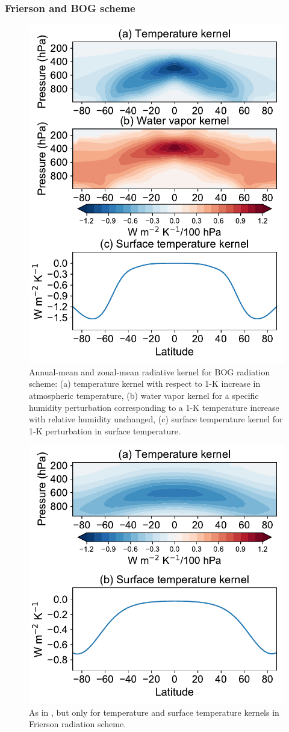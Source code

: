 \subsubsection{Frierson and BOG scheme}
\begin{figure}[tbhp] %
	\centering
	\includegraphics[width=.6\linewidth]{figs/polar_amp/kernels_byrne}
	\caption{Annual-mean and zonal-mean radiative kernel for BOG radiation scheme: (a) temperature kernel with respect to 1-K increase in atmospheric temperature, (b) water vapor kernel for a specific humidity perturbation corresponding to a 1-K temperature increase with relative humidity unchanged, (c) surface temperature kernel for 1-K perturbation in surface temperature.}
	\label{fig:bog_kernels}
\end{figure}

\begin{figure}[tbhp] %
	\centering
	\includegraphics[width=.6\linewidth]{figs/polar_amp/kernels_frierson}
	\caption{As in , but only for temperature and surface temperature kernels in Frierson radiation scheme.}
	\label{fig:frierson_kernels}
\end{figure}

